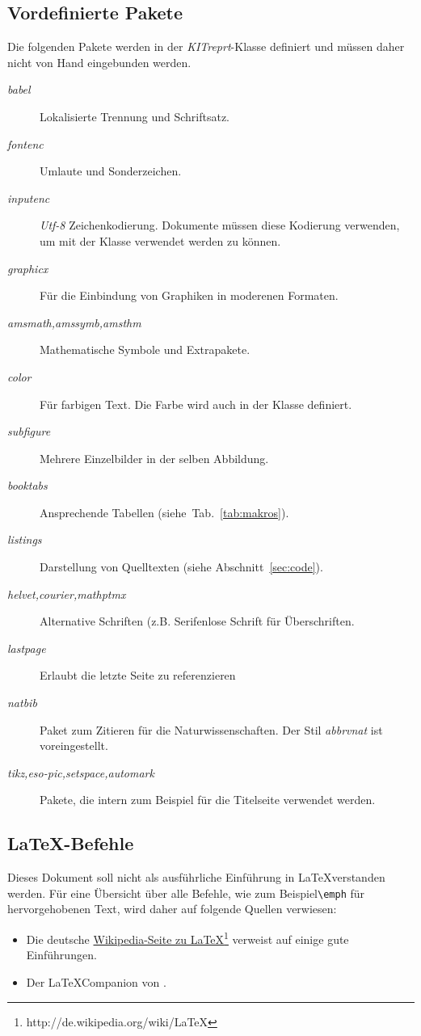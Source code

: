 \documentclass[english,ngerman]{KITreprt}
\begin{document}
\subsection{Vordefinierte Pakete }
Die folgenden Pakete werden in der \emph{KITreprt}-Klasse definiert und m\"ussen daher nicht von Hand eingebunden werden.
\begin{description}
\item[\emph{babel}] Lokalisierte Trennung und Schriftsatz. 
\item[\emph{fontenc}] Umlaute und Sonderzeichen.
\item[\emph{inputenc}] \emph{Utf-8} Zeichenkodierung. Dokumente m\"ussen diese Kodierung verwenden, um mit der Klasse verwendet werden zu k\"onnen.
\item[\emph{graphicx}] F\"ur die Einbindung von Graphiken in moderenen Formaten.
\item[\emph{amsmath,amssymb,amsthm}] Mathematische Symbole und Extrapakete.
\item[\emph{color}] F\"ur farbigen Text. Die Farbe  wird auch in der Klasse definiert.
\item[\emph{subfigure}] Mehrere Einzelbilder in der selben Abbildung.
\item[\emph{booktabs}] Ansprechende Tabellen (siehe~Tab.~\ref{tab:makros}).
\item[\emph{listings}] Darstellung von Quelltexten (siehe Abschnitt~\ref{sec:code}).
\item[\emph{helvet,courier,mathptmx}] Alternative Schriften (z.B. Serifenlose Schrift f\"ur \"Uberschriften.
\item[\emph{lastpage}] Erlaubt die letzte Seite zu referenzieren
\item[\emph{natbib}] Paket zum Zitieren für die Naturwissenschaften. Der Stil \emph{abbrvnat} ist voreingestellt.
\item[\emph{tikz,eso-pic,setspace,automark}] Pakete, die intern zum Beispiel f\"ur die Titelseite verwendet werden.
\end{description}

\subsection{\LaTeX-Befehle}

Dieses Dokument soll nicht als ausf\"uhrliche Einf\"uhrung in \LaTeX verstanden werden.
F\"ur eine \"Ubersicht \"uber alle Befehle, wie zum Beispiel\lstinline[language={[LaTeX]TeX}]!\emph! f\"ur hervorgehobenen Text, wird daher auf folgende Quellen verwiesen:
\begin{itemize}
\item Die deutsche \href{http://de.wikipedia.org/wiki/LaTeX}{Wikipedia-Seite zu \LaTeX}\footnote{http://de.wikipedia.org/wiki/LaTeX} verweist auf einige gute Einf\"uhrungen.
\item Der \LaTeX Companion von \citet*{latexcompanion}.
\end{itemize}
\end{document}
